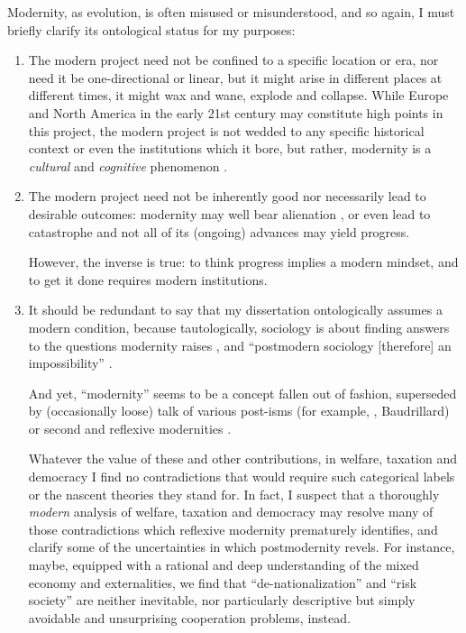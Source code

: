 Modernity, as evolution, is often misused or misunderstood, and so again, I must briefly clarify its ontological status for my purposes:

\begin{enumerate}
	\item
	The modern project need not be confined to a specific location or era, nor need it be one-directional or linear, but it might arise in different places at different times, it might wax and wane, explode and collapse.
	While Europe and North America in the early 21st century may constitute high points in this project, the modern project is not wedded to any specific historical context or even the institutions which it bore, but rather, modernity is a \emph{cultural} and \emph{cognitive} phenomenon \citep[26, emphasis added]{JonesJones-2003-aa}.

	\item
	The modern project need not be inherently good nor necessarily lead to desirable outcomes:
	modernity may well bear alienation \citep{Adorno1966}, or even lead to catastrophe \citep{Bauman1989} and not all of its (ongoing) advances may yield progress.

	However, the inverse is true:
	to think progress implies a modern mindset, and to get it done requires modern institutions.

	\item
	It should be redundant to say that my dissertation ontologically assumes a modern condition, because tautologically, sociology is about finding answers to the questions modernity raises \citep[325]{Harriss2000}, and ``postmodern sociology [therefore] an impossibility'' \citep[169]{Miles-2001-aa}.

	And yet, ``modernity'' seems to be a concept fallen out of fashion, superseded by (occasionally loose) talk of various post-isms (for example, \citealt{Lyotard1984}, Baudrillard) or second and reflexive modernities \citep[for example,][]{BeckBonss-2003-aa}.

	Whatever the value of these and other contributions, in welfare, taxation and democracy I find no contradictions that would require such categorical labels or the nascent theories they stand for.
	In fact, I suspect that a thoroughly \emph{modern} analysis of welfare, taxation and democracy may resolve many of those contradictions which reflexive modernity prematurely identifies, and clarify some of the uncertainties in which postmodernity revels.
	For instance, maybe, equipped with a rational and deep understanding of the mixed economy and externalities, we find that ``de-nationalization'' \citep{BeckGrande-2007-aa} and ``risk society'' \cite{Beck-1992-aa} are neither inevitable, nor particularly descriptive but simply avoidable and unsurprising cooperation problems, instead.


\end{enumerate}
